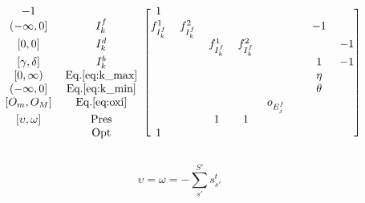 \documentclass[]{elsarticle}
\begin{document}
\begin{equation}
\begin{blockarray}{cccccccccc}
\begin{block}{cc[cccccccc]}
            -1                 &                   & 1                 &
             \\
            {(-\infty,0]}      & I_{k}^{f}         & f_{I_{k}^{f}}^{1} &
            f_{I_{k}^{f}}^{2}  &                   &                   &
                               &                   & -1                &
             \\
            {[0,0]}            & I_{k}^{d}         &                   &
                               & f_{I_{k}^{f}}^{1} & f_{I_{k}^{f}}^{2} &
                               &                   &                   &
            -1 \\
            {[\gamma, \delta]}
                               & I_{k}^{b}         &                   &
                               &                   &                   &
                               &                   & 1                 &
            -1 \\ 
            {[0, \infty)}      & \text{Eq.}\ref{eq:k_max}&             &
                               &                   &                   &
                               &                   & \eta             &
             \\
            {(-\infty, 0]}     & \text{Eq.}\ref{eq:k_min} &            &
                               &                   &                   &
                               &                   & \theta            & 
             \\
            {[O_{m},O_{M}]}    & \text{Eq.}\ref{eq:oxi} &              &
                               &                   &                   &
             o_{E_{j}^{f}}     &                   &                   &
             \\
            {[\upsilon,\omega]} & \text{Pres}      &                   &
                               & 1                 & 1                 &
                               &                   &                   &
             \\
                               & \text{Opt}        & 1                 &
                               &                   &                   &
                               &                   &                   &
             \\
            \end{block}
        \end{blockarray}
    \end{equation}

\begin{equation}
\label{eq:upsilon_bound}
\upsilon = \omega = -\sum \limits_{s'}^{S'} s_{s'}^{t}
\end{equation}
\end{document}
